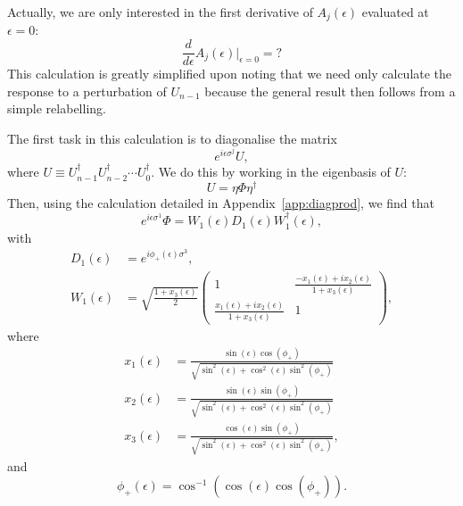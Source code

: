 \documentclass[12pt]{amsart}
\theoremstyle{definition}
\theoremstyle{remark}
\numberwithin{equation}{section}
\begin{document}
Actually, we are only interested in the first derivative of $A_j(\epsilon)$ evaluated at $\epsilon = 0$:
\begin{equation}
	\frac{d}{d\epsilon} A_j(\epsilon) \bigg|_{\epsilon = 0} = ?
\end{equation}
This calculation is greatly simplified upon noting that we need only calculate the response to a perturbation of $U_{n-1}$ because the general result then follows from a simple relabelling.

The first task in this calculation is to diagonalise the matrix
\begin{equation}
	e^{i\epsilon \sigma^j}U,
\end{equation}
where $U \equiv U_{n-1}^\dag U_{n-2}^\dag \cdots U_0^\dag$. We do this by working in the eigenbasis of $U$:
\begin{equation}
	U = \eta \Phi \eta^\dag
\end{equation}
Then, using the calculation detailed in Appendix~\ref{app:diagprod}, we find that
\begin{equation}
	e^{i\epsilon \sigma^1}\Phi = W_1(\epsilon) D_1(\epsilon) W_1^\dag(\epsilon),
\end{equation}
with
\begin{equation}
	\begin{split}
		D_1(\epsilon) &= e^{i\phi_+(\epsilon) \sigma^3}, \\
		W_1(\epsilon) &= \sqrt{\frac{1+x_3(\epsilon)}{2}}\begin{pmatrix} 1 & \frac{-x_1(\epsilon)+ix_2(\epsilon)}{1+x_3(\epsilon)}\\ \frac{x_1(\epsilon)+ix_2(\epsilon)}{1+x_3(\epsilon)} & 1\end{pmatrix},
	\end{split}
\end{equation}
where
\begin{equation}
	\begin{split}
		x_1(\epsilon) &= \frac{\sin(\epsilon)\cos(\phi_+)}{\sqrt{\sin^2(\epsilon) + \cos^2(\epsilon)\sin^2(\phi_+)}}\\
		x_2(\epsilon) &= \frac{\sin(\epsilon)\sin(\phi_+)}{\sqrt{\sin^2(\epsilon) + \cos^2(\epsilon)\sin^2(\phi_+)}}\\
		x_3(\epsilon) &= \frac{\cos(\epsilon)\sin(\phi_+)}{\sqrt{\sin^2(\epsilon) + \cos^2(\epsilon)\sin^2(\phi_+)}},
	\end{split}
\end{equation}
and
\begin{equation}
	\phi_+(\epsilon) = \cos^{-1}(\cos(\epsilon)\cos(\phi_+)).
\end{equation}
\end{document}
